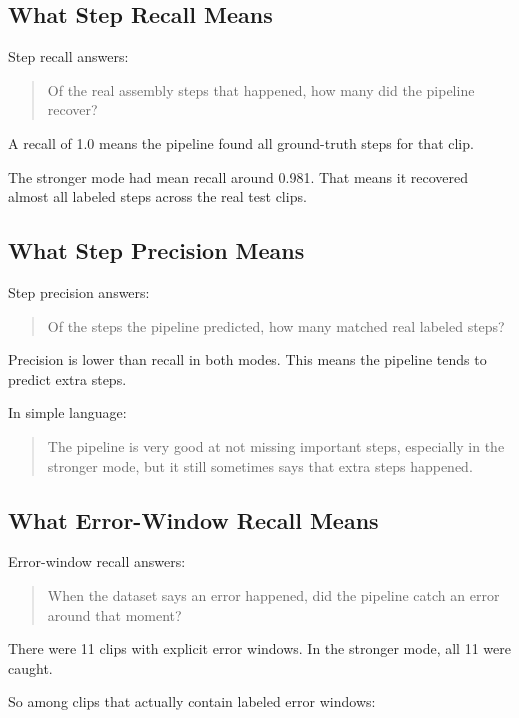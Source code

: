 \documentclass[11pt,a4paper]{article}
\begin{document}
\subsection{What Step Recall Means}

Step recall answers:

\begin{quote}
Of the real assembly steps that happened, how many did the pipeline recover?
\end{quote}

A recall of 1.0 means the pipeline found all ground-truth steps for that clip.

The stronger mode had mean recall around 0.981. That means it recovered almost all labeled steps across the real test clips.

\subsection{What Step Precision Means}

Step precision answers:

\begin{quote}
Of the steps the pipeline predicted, how many matched real labeled steps?
\end{quote}

Precision is lower than recall in both modes. This means the pipeline tends to predict extra steps.

In simple language:

\begin{quote}
The pipeline is very good at not missing important steps, especially in the stronger mode, but it still sometimes says that extra steps happened.
\end{quote}

\subsection{What Error-Window Recall Means}

Error-window recall answers:

\begin{quote}
When the dataset says an error happened, did the pipeline catch an error around that moment?
\end{quote}

There were 11 clips with explicit error windows. In the stronger mode, all 11 were caught.

So among clips that actually contain labeled error windows:
\end{document}
